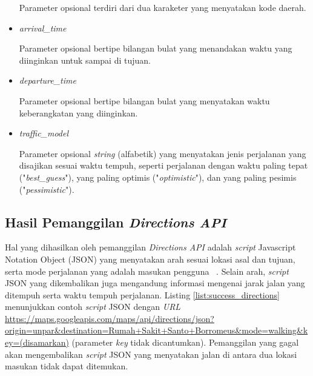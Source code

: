 \begin{itemize}
	Parameter opsional terdiri dari dua karaketer yang menyatakan kode daerah.
	\item \textit{arrival\_time} 
	
	Parameter opsional bertipe bilangan bulat yang menandakan waktu yang diinginkan untuk sampai di tujuan.
	\item \textit{departure\_time} 
	
	Parameter opsional bertipe bilangan bulat yang menyatakan waktu keberangkatan yang diinginkan.
	\item \textit{traffic\_model}
	
	Parameter opsional \textit{string} (alfabetik) yang menyatakan jenis perjalanan yang disajikan sesuai waktu tempuh, seperti perjalanan dengan waktu paling tepat ("\textit{best\_guess}"), yang paling optimis ("\textit{optimistic}"), dan yang paling pesimis ("\textit{pessimistic}").
	
\end{itemize}


\subsection{Hasil Pemanggilan \textit{Directions API}}
Hal yang dihasilkan oleh pemanggilan \textit{Directions API} adalah \textit{script} Javascript Notation Object (JSON) yang menyatakan arah sesuai lokasi asal dan tujuan, serta mode perjalanan yang adalah masukan pengguna ~\cite{directions-api}. Selain arah, \textit{script} JSON yang dikembalikan juga mengandung informasi mengenai jarak jalan yang ditempuh serta waktu tempuh perjalanan. Listing \ref{list:success_directions} menunjukkan contoh \textit{script} JSON dengan \textit{URL} \url{https://maps.googleapis.com/maps/api/directions/json?origin=unpar&destination=Rumah+Sakit+Santo+Borromeus&mode=walking&key=(disamarkan)} (parameter \textit{key} tidak dicantumkan). Pemanggilan yang gagal akan mengembalikan \textit{script} JSON yang menyatakan jalan di antara dua lokasi masukan tidak dapat ditemukan.


